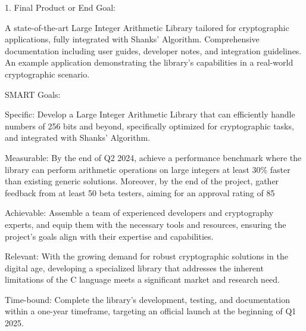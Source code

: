 \documentclass[12pt,a4paper]{article}
\begin{document}
	1. Final Product or End Goal:
	
	A state-of-the-art Large Integer Arithmetic Library tailored for cryptographic applications, fully integrated with Shanks' Algorithm.
	Comprehensive documentation including user guides, developer notes, and integration guidelines.
	An example application demonstrating the library's capabilities in a real-world cryptographic scenario.
	
	
	SMART Goals:
	
	Specific: Develop a Large Integer Arithmetic Library that can efficiently handle numbers of 256 bits and beyond, specifically optimized for cryptographic tasks, and integrated with Shanks' Algorithm.
	
	Measurable: By the end of Q2 2024, achieve a performance benchmark where the library can perform arithmetic operations on large integers at least 30\% faster than existing generic solutions. Moreover, by the end of the project, gather feedback from at least 50 beta testers, aiming for an approval rating of 85%
	
	Achievable: Assemble a team of experienced developers and cryptography experts, and equip them with the necessary tools and resources, ensuring the project's goals align with their expertise and capabilities.
	
	Relevant: With the growing demand for robust cryptographic solutions in the digital age, developing a specialized library that addresses the inherent limitations of the C language meets a significant market and research need.
	
	Time-bound: Complete the library's development, testing, and documentation within a one-year timeframe, targeting an official launch at the beginning of Q1 2025.
	
	
\end{document}
